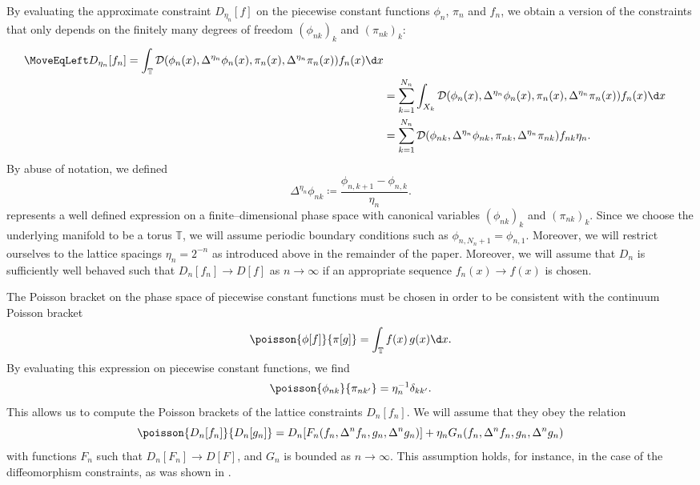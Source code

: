 By evaluating the approximate constraint $D_{\eta_n}[f]$ on the piecewise constant functions $\phi_n$, $\pi_n$ and $f_n$, we obtain a version of the constraints that only depends on the finitely many degrees of freedom $(\phi_{nk})_k$ and $(\pi_{nk})_k$:
\begin{align}
    \MoveEqLeft D_{\eta_n}[f_n]
         = \int_{\mathbb T} \mathcal D(\phi_n(x), \Delta^{\eta_n} \phi_n(x), \pi_n(x), \Delta^{\eta_n} \pi_n(x)) f_n(x) \d x \\
        &= \sum_{k=1}^{N_n} \int_{X_k} \mathcal D(\phi_n(x), \Delta^{\eta_n} \phi_n(x), \pi_n(x), \Delta^{\eta_n} \pi_n(x)) f_n(x) \d x \\
        &= \sum_{k=1}^{N_n} \mathcal D(\phi_{nk}, \Delta^{\eta_n} \phi_{nk}, \pi_{nk}, \Delta^{\eta_n} \pi_{nk}) f_{nk} \eta_n . \label{eq:constraint-lattice}
\end{align}
By abuse of notation, we defined
\begin{equation}
    \Delta^{\eta_n} \phi_{nk} \coloneq \frac{\phi_{n,k+1} - \phi_{n,k}}{\eta_n} .
\end{equation}
 represents a well defined expression on a finite--dimensional phase space with canonical variables $(\phi_{nk})_k$ and $(\pi_{nk})_k$.
Since we choose the underlying manifold to be a torus $\mathbb T$, we will assume periodic boundary conditions such as $\phi_{n,N_n+1} = \phi_{n,1}$.
Moreover, we will restrict ourselves to the lattice spacings $\eta_n = 2^{-n}$ as introduced above in the remainder of the paper.
Moreover, we will assume that $D_n$ is sufficiently well behaved such that $D_n[f_n]\to D[f]$ as $n\to\infty$ if an appropriate sequence $f_n(x)\to f(x)$ is chosen.

The Poisson bracket on the phase space of piecewise constant functions must be chosen in order to be consistent with the continuum Poisson bracket
\begin{equation}
    \poisson{\phi[f]}{\pi[g]} = \int_{\mathbb T} f(x)\, g(x) \d x .
\end{equation}
By evaluating this expression on piecewise constant functions, we find \parencite[cf.][]{lattice}
\begin{equation}
    \poisson{\phi_{nk}}{\pi_{nk'}} = \eta_n^{-1} \delta_{kk'} . \label{eq:classical-lattice-ccr}
\end{equation}
This allows us to compute the Poisson brackets of the lattice constraints $D_n[f_n]$.
We will assume that they obey the relation
\begin{equation}
    \poisson{D_n[f_n]}{D_n[g_n]} = D_n[F_n(f_n,\Delta^n f_n,g_n,\Delta^n g_n)] + \eta_n G_n(f_n,\Delta^n f_n,g_n,\Delta^n g_n) \label{eq:classical-lattice-algebra}
\end{equation}
with functions $F_n$ such that $D_n[F_n]\to D[F]$, and $G_n$ is bounded as $n\to\infty$.
This assumption holds, for instance, in the case of the diffeomorphism constraints, as was shown in \textcite{lattice}.

